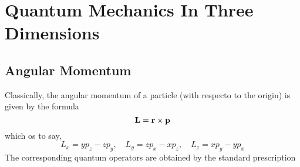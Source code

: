 \chapter{Quantum Mechanics In Three Dimensions}


\section{Angular Momentum}
Classically, the angular momentum of a particle (with respecto to the origin) is given by the formula
\begin{equation}\label{4.95}
	\vb{L}=\vb{r}\times\vb{p}
\end{equation}
which os to say,
\begin{equation}\label{4.96}
	L_x=yp_z-zp_y,\quad L_y=zp_x-xp_z,\quad L_z=xp_y-yp_x
\end{equation}
The corresponding quantum operators are obtained by the standard prescription

